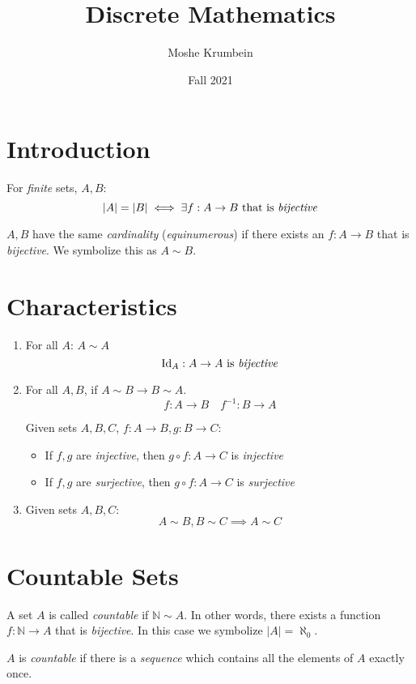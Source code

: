\documentclass[00_complete]{subfiles}
\title{Discrete Mathematics}
\author{Moshe Krumbein}
\date{Fall 2021}
\begin{document}

\section{Introduction}
\begin{reminder}
    For \emph{finite} sets, $A,B$:
    $$|A|=|B| \iff \exists f:A\to B \text{ that is \emph{bijective}}$$
\end{reminder}
\begin{definition}[Equinumerosity]
    $A, B$ have the same \emph{cardinality} (\emph{equinumerous}) if there
    exists an $f:A\to B$ that is \emph{bijective}. We symbolize this as $A\sim
    B$.
\end{definition}
\section{Characteristics}
\begin{enumerate}
    \item For all $A$: $A \sim A$
    $$\operatorname{Id}_A:A\to A \text{ is \emph{bijective}}$$

    \item For all $A,B$, if $A \sim B \to B \sim A$.
    $$f:A \to B \quad f^{-1}: B \to A$$
\begin{claim}
    Given sets $A,B,C$, $f:A\to B, g:B \to C$:
    \begin{itemize}
        \item If $f,g$ are \emph{injective}, then $g \circ f: A \to C$ is
            \emph{injective}
        \item If $f,g$ are \emph{surjective}, then $g \circ f:A \to C$ is
            \emph{surjective}
    \end{itemize}
\end{claim}
    \item Given sets $A,B,C$:
        $$A \sim B, B \sim C \implies A \sim C$$
\end{enumerate}
\section{Countable Sets}
\begin{definition}
    A set $A$ is called \emph{countable} if $\mathbb{N} \sim A$. In other
    words, there exists a function $f: \mathbb{N} \to A$ that is
    \emph{bijective}. In this case we symbolize $|A|=\aleph_0$.
\end{definition}
\begin{note}
    $A$ is \emph{countable} if there is a \emph{sequence} which contains all
    the elements of $A$ exactly once.
\end{note}
\end{document}
